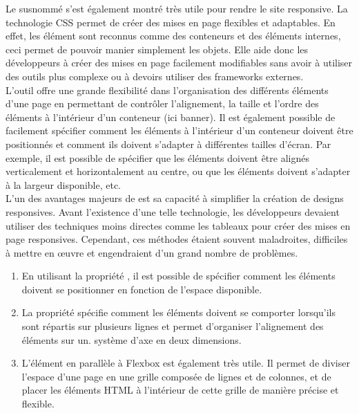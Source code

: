 \documentclass[a4,10pt,french]{sphinxmanual}
\begin{document}
\sphinxAtStartPar
Le  susnommé s’est également montré très utile pour rendre le site responsive. La technologie CSS  permet de créer des mises en page flexibles et adaptables. En effet, les élément sont reconnus comme des conteneurs et des éléments internes, ceci permet de pouvoir manier simplement les objets. Elle aide donc les développeurs à créer des mises en page facilement modifiables sans avoir à utiliser des outils plus complexe ou à devoirs utiliser des frameworks externes.\\
L’outil  offre une grande flexibilité dans l’organisation des différents éléments d’une page en permettant de contrôler l’alignement, la taille et l’ordre des éléments à l’intérieur d’un conteneur (ici banner). Il est également possible de facilement spécifier comment les éléments à l’intérieur d’un conteneur doivent être positionnés et comment ils doivent s’adapter à différentes tailles d’écran. Par exemple, il est possible de spécifier que les éléments doivent être alignés verticalement et horizontalement au centre, ou que les éléments doivent s’adapter à la largeur disponible, etc.\\
L’un des avantages majeurs de  est sa capacité à simplifier la création de designs responsives. Avant l’existence d’une telle technologie, les développeurs devaient utiliser des techniques moins directes comme les tableaux pour créer des mises en page responsives. Cependant, ces méthodes étaient souvent maladroites, difficiles à mettre en œuvre et engendraient d’un grand nombre de problèmes.
\begin{enumerate}
%
\item {} 
\sphinxAtStartPar
En utilisant la propriété , il est possible de spécifier comment les éléments doivent se positionner en fonction de l’espace disponible.

\item {} 
\sphinxAtStartPar
La propriété  spécifie comment les éléments doivent se comporter lorsqu’ils sont répartis sur plusieurs lignes et permet d’organiser l’alignement des éléments sur un. système d’axe en deux dimensions.

\item {} 
\sphinxAtStartPar
L’élément  en parallèle à Flex\sphinxhyphen{}box est également très utile. Il permet de diviser l’espace d’une page en une grille composée de lignes et de colonnes, et de placer les éléments HTML à l’intérieur de cette grille de manière précise et flexible.

\end{enumerate}
\end{document}
